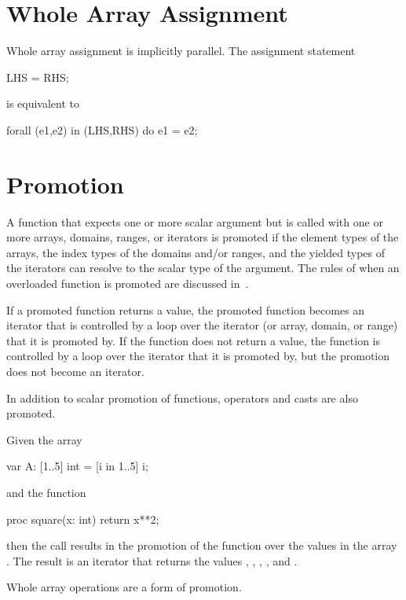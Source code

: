 \section{Whole Array Assignment}

Whole array assignment is implicitly parallel.  The assignment
statement
\begin{chapel}
LHS = RHS;
\end{chapel}
is equivalent to
\begin{chapel}
forall (e1,e2) in (LHS,RHS) do
  e1 = e2;
\end{chapel}

\section{Promotion}
\label{Promotion}

A function that expects one or more scalar argument but is called with
one or more arrays, domains, ranges, or iterators is promoted if the
element types of the arrays, the index types of the domains and/or
ranges, and the yielded types of the iterators can resolve to the
scalar type of the argument.  The rules of when an overloaded function
is promoted are discussed in~.

If a promoted function returns a value, the promoted function becomes
an iterator that is controlled by a loop over the iterator (or array,
domain, or range) that it is promoted by.  If the function does not
return a value, the function is controlled by a loop over the iterator
that it is promoted by, but the promotion does not become an iterator.

In addition to scalar promotion of functions, operators and casts are
also promoted.

\begin{example}
Given the array
\begin{chapel}
var A: [1..5] int = [i in 1..5] i;
\end{chapel}
and the function
\begin{chapel}
proc square(x: int) return x**2;
\end{chapel}
then the call  results in the promotion of
the  function over the values in the array .  The
result is an iterator that returns the
values , , , , and .
\end{example}

Whole array operations are a form of promotion.

